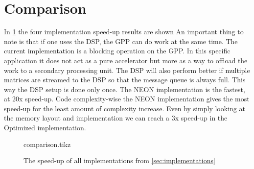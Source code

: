 \documentclass[final]{article}
\begin{document}
\section{Comparison}
\label{sec:comparison}
In \cref{fig:comparison} the four implementation speed-up results are shown
An important thing to note is that if one uses the DSP, the GPP can do work at the same time.
The current implementation is a blocking operation on the GPP.
In this specific application it does not act as a pure accelerator but more as a way to offload the work to a secondary processing unit.
The DSP will also perform better if multiple matrices are streamed to the DSP so that the message queue is always full.
This way the DSP setup is done only once.
The NEON implementation is the fastest, at 20x speed-up. %
Code complexity-wise the NEON implementation gives the most speed-up for the least amount of complexity increase.
Even by simply looking at the memory layout and implementation we can reach a 3x speed-up in the Optimized implementation.

\begin{figure}
\centering
\setlength{}
\setlength{}
{comparison.tikz}
\caption{The speed-up of all implementations from \cref{sec:implementations}}
\label{fig:comparison}
\end{figure}
\end{document}
